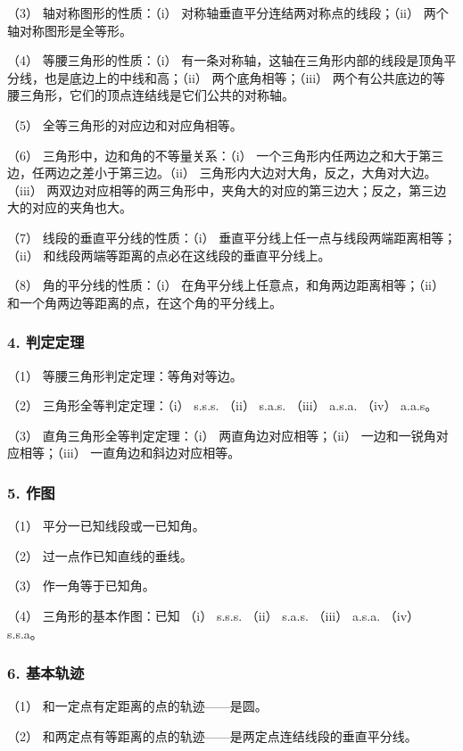 （3） 轴对称图形的性质：（i） 对称轴垂直平分连结两对称点的线段；（ii）
两个轴对称图形是全等形。

（4） 等腰三角形的性质：（i）
有一条对称轴，这轴在三角形内部的线段是顶角平分线，也是底边上的中线和高；（ii）
两个底角相等；（iii）
两个有公共底边的等腰三角形，它们的顶点连结线是它们公共的对称轴。

（5） 全等三角形的对应边和对应角相等。

（6） 三角形中，边和角的不等量关系：（i）
一个三角形内任两边之和大于第三边，任两边之差小于第三边。（ii）
三角形内大边对大角，反之，大角对大边。（iii）
两双边对应相等的两三角形中，夹角大的对应的第三边大；反之，第三边大的对应的夹角也大。

（7） 线段的垂直平分线的性质：（i）
垂直平分线上任一点与线段两端距离相等；（ii）
和线段两端等距离的点必在这线段的垂直平分线上。

（8） 角的平分线的性质：（i）
在角平分线上任意点，和角两边距离相等；（ii）
和一个角两边等距离的点，在这个角的平分线上。

\subsubsection{4. 判定定理}

（1） 等腰三角形判定定理：等角对等边。

（2） 三角形全等判定定理：（i） s.s.s. （ii） s.a.s. （iii） a.s.a.
（iv） a.a.s。

（3） 直角三角形全等判定定理：（i） 两直角边对应相等；（ii）
一边和一锐角对应相等；（iii） 一直角边和斜边对应相等。

\subsubsection{5. 作图}

（1） 平分一已知线段或一已知角。

（2） 过一点作已知直线的垂线。

（3） 作一角等于已知角。

（4） 三角形的基本作图：已知 （i） s.s.s. （ii） s.a.s. （iii） a.s.a.
（iv） s.s.a。

\subsubsection{6. 基本轨迹}

（1） 和一定点有定距离的点的轨迹------是圆。

（2） 和两定点有等距离的点的轨迹------是两定点连结线段的垂直平分线。

